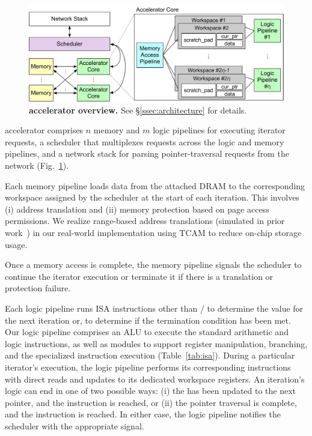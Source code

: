 \begin{figure}[t]
\centering
  \includegraphics[width=\columnwidth]{fig/pulse/accelerator.pdf}
  \vspace{-2em}
 \caption[\pulse accelerator overview]{\textbf{\pulse accelerator overview.} See \S\ref{ssec:architecture} for details.}
\label{fig:accelnew}
\end{figure}

 \pulse accelerator comprises $n$ memory and $m$ logic pipelines for executing iterator requests, a scheduler that multiplexes requests across the logic and memory pipelines, and a network stack for parsing pointer-traversal requests from the network (Fig.~\ref{fig:accelnew}).

 Each memory pipeline loads data from the attached DRAM 
to the corresponding workspace assigned by the scheduler at the start of each iteration. This involves (i) address translation and (ii) memory protection based on page access permissions. We realize range-based address translations (simulated in prior work~\cite{range}) in our real-world implementation using TCAM to reduce on-chip storage usage. 

Once a memory access is complete, the memory pipeline signals the scheduler to continue the iterator execution or terminate it if there is a translation or protection failure.


 Each logic pipeline runs \pulse ISA instructions other than / to determine the  value for the next iteration or, to determine if the termination condition has been met. Our logic pipeline comprises an ALU to execute the standard arithmetic and logic instructions, as well as modules to support register manipulation, branching, and the specialized  instruction execution (Table~\ref{tab:isa}). During a particular iterator's execution, the logic pipeline performs its corresponding instructions with direct reads and updates to its dedicated workspace registers. An iteration's logic can end in one of two possible ways: (i) the  has been updated to the next pointer, and the  instruction is reached, or (ii) the pointer traversal is complete, and the  instruction is reached. In either case, the logic pipeline notifies the scheduler with the appropriate signal.


